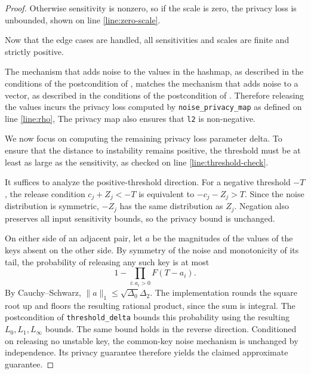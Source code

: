 \documentclass{article}
\begin{document}
\begin{proof}
    Otherwise sensitivity is nonzero, so if the scale is zero,
    the privacy loss is unbounded, shown on line \ref{line:zero-scale}.

    Now that the edge cases are handled, all sensitivities and scales are finite and strictly positive.

    The mechanism that adds noise to the values in the hashmap, as described in the conditions of the postcondition of ,
    matches the mechanism that adds noise to a vector, as described in the conditions of the postcondition of .
    Therefore releasing the values incurs the privacy loss computed by \texttt{noise\_privacy\_map} as defined on line \ref{line:rho},
    The privacy map also ensures that \texttt{l2} is non-negative.

    We now focus on computing the remaining privacy loss parameter delta.
    To ensure that the distance to instability remains positive,
    the threshold must be at least as large as the sensitivity, as checked on line \ref{line:threshold-check}.

    It suffices to analyze the positive-threshold direction.
    For a negative threshold $-T$, the release condition $c_j + Z_j < -T$
    is equivalent to $-c_j - Z_j > T$.
    Since the noise distribution is symmetric, $-Z_j$ has the same distribution as $Z_j$.
    Negation also preserves all input sensitivity bounds, so the privacy bound is unchanged.

    On either side of an adjacent pair, let $a$ be the magnitudes of the values of the keys absent on the other side.
    By symmetry of the noise and monotonicity of its tail, the probability of releasing any such key is at most
    \[
       1-\prod_{i:a_i>0}F(T-a_i).
    \]
    By Cauchy--Schwarz, $\|a\|_1\le\sqrt{\Delta_0}\Delta_2$.
    The implementation rounds the square root up and floors the resulting rational product, since the sum is integral.
    The postcondition of \texttt{threshold\_delta} bounds this probability using the resulting $L_0,L_1,L_\infty$ bounds.
    The same bound holds in the reverse direction.
    Conditioned on releasing no unstable key, the common-key noise mechanism is unchanged by independence.
    Its privacy guarantee therefore yields the claimed approximate guarantee.
\end{proof}



\end{document}
